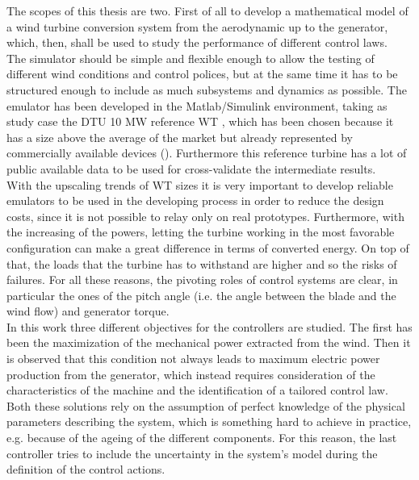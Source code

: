 The scopes of this thesis are two. First of all to develop a mathematical model of a wind turbine conversion system from the aerodynamic up to the generator, which, then, shall be used to study the performance of different control laws.\\
The simulator should be simple and flexible enough to allow the testing of different wind conditions and control polices, but at the same time it has to be structured enough to include as much subsystems and dynamics as possible. The emulator has been developed in the Matlab/Simulink environment, taking as study case the DTU 10 MW reference WT \cite{DTU_Wind_Energy_Report-I-0092}, which has been chosen because it has a size above the average of the market but already represented by commercially available devices (\cite{wind_europe_data_2022}). Furthermore this reference turbine has a lot of public available data to be used for cross-validate the intermediate results.\\
With the upscaling trends of WT sizes it is very important to develop reliable emulators to be used in the developing process in order to reduce the design costs, since it is not possible to relay only on real prototypes. Furthermore, with the increasing of the powers, letting the turbine working in the most favorable configuration can make a great difference in terms of converted energy. On top of that, the loads that the turbine has to withstand are higher and so the risks of failures. For all these reasons, the pivoting roles of control systems are clear, in particular the ones of the pitch angle (i.e. the angle between the blade and the wind flow) and generator torque.\\
 In this work three different objectives for the controllers are studied. The first has been the maximization of the mechanical power extracted from the wind. Then it is observed that this condition not always leads to maximum electric power production from the generator, which instead requires consideration of the characteristics of the machine and the identification of a tailored control law. Both these solutions rely on the assumption of perfect knowledge of the physical parameters describing the system, which is something hard to achieve in practice, e.g. because of the ageing of the different components. For this reason, the last controller tries to include the uncertainty in the system's model during the definition of the control actions.  

